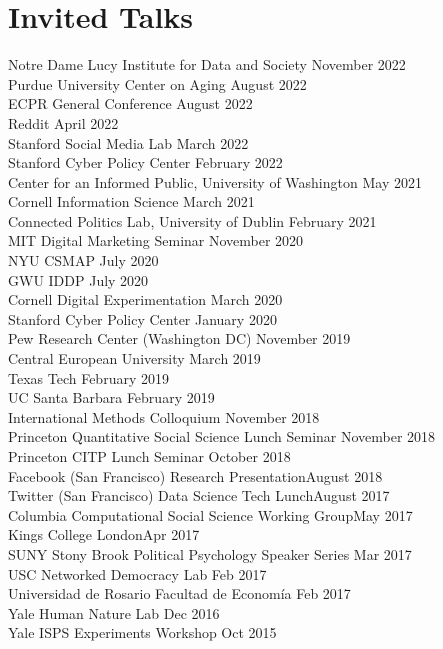 \documentclass[margin]{res}
\begin{document}
{\section{Invited Talks}
Notre Dame Lucy Institute for Data and Society \hfill November 2022\\
Purdue University Center on Aging \hfill August 2022\\
ECPR General Conference \hfill August 2022\\
Reddit \hfill April 2022\\
Stanford Social Media Lab \hfill March 2022\\
Stanford Cyber Policy Center \hfill February 2022\\
Center for an Informed Public, University of Washington \hfill May 2021\\
Cornell Information Science \hfill March 2021\\
Connected Politics Lab, University of Dublin \hfill February 2021\\
MIT Digital Marketing Seminar \hfill November 2020\\
NYU CSMAP  \hfill July 2020\\
GWU IDDP \hfill July 2020\\
Cornell Digital Experimentation	  \hfill March 2020\\
Stanford Cyber Policy Center \hfill January 2020\\
Pew Research Center (Washington DC) \hfill November 2019\\
Central European University  \hfill March 2019 \\ 
Texas Tech \hfill February 2019 \\ 
UC Santa Barbara \hfill February 2019 \\ 
International Methods Colloquium \hfill November 2018 \\
Princeton Quantitative Social Science Lunch Seminar \hfill November 2018 \\
Princeton CITP Lunch Seminar \hfill October 2018 \\
Facebook (San Francisco) Research Presentation\hfill August 2018\\
Twitter (San Francisco) Data Science Tech Lunch\hfill August 2017\\
Columbia Computational Social Science Working Group\hfill May 2017\\
Kings College London\hfill Apr 2017\\
SUNY Stony Brook Political Psychology Speaker Series \hfill Mar 2017\\
USC Networked Democracy Lab \hfill Feb 2017\\
Universidad de Rosario Facultad de Econom\'ia \hfill Feb 2017\\
Yale Human Nature Lab \hfill Dec 2016\\
Yale ISPS Experiments Workshop \hfill Oct 2015
}
\end{document}
